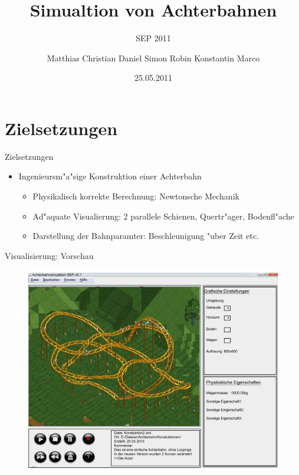 \documentclass[
	ngerman,
	xcolor=dvipsnames,
	11pt
	]{beamer}
\title[SEP 2011]{Simualtion von Achterbahnen}
\subtitle{SEP 2011}
\author{\tiny{Matthias Christian Daniel Simon  Robin Konstantin Marco}}
\institute[TU-BS]{Technische Universit"at Carolo-Wilhelmina zu Braunschweig}
\date{25.05.2011}
\begin{document}
	\begin{frame}
		\titlepage
	\end{frame}
		
	\section{Zielsetzungen}
	\begin{frame}{Zielsetzungen}
	\begin{itemize}
	\item Ingenieursm"a"sige Konstruktion einer Achterbahn
		\begin{itemize}
			\item Physikalisch korrekte Berechnung: Newtonsche Mechanik
			\item Ad"aquate Visualierung: 2 parallele Schienen, Quertr"ager, Bodenfl"ache
			\item Darstellung der Bahnparamter: Beschleunigung "uber Zeit etc.
		\end{itemize}
		
	\end{itemize}

	\end{frame}
	
	

	
	\begin{frame}{Visualisierung: Vorschau}
		\begin{figure}
			\includegraphics[width=0.78\linewidth]{GUI_v3.jpg}
		\end{figure}
	\end{frame}
	
\end{document}
